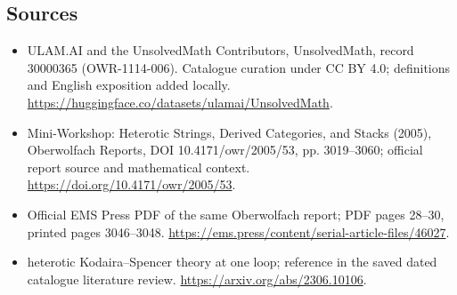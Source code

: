 \documentclass[11pt]{article}
\begin{document}
\subsection{Sources}
\begin{itemize}
\item[\hypertarget{source:30000365:1}{S1}] ULAM.AI and the UnsolvedMath Contributors, UnsolvedMath, record 30000365 (OWR-1114-006). Catalogue curation under CC BY 4.0; definitions and English exposition added locally.
\url{https://huggingface.co/datasets/ulamai/UnsolvedMath}.
\item[\hypertarget{source:30000365:2}{S2}] Mini-Workshop: Heterotic Strings, Derived Categories, and Stacks (2005), Oberwolfach Reports, DOI 10.4171/owr/2005/53, pp. 3019--3060; official report source and mathematical context.
\url{https://doi.org/10.4171/owr/2005/53}.
\item[\hypertarget{source:30000365:3}{S3}] Official EMS Press PDF of the same Oberwolfach report; PDF pages 28--30, printed pages 3046--3048.
\url{https://ems.press/content/serial-article-files/46027}.
\item[\hypertarget{source:30000365:4}{S4}] heterotic Kodaira--Spencer theory at one loop; reference in the saved dated catalogue literature review.
\url{https://arxiv.org/abs/2306.10106}.
\end{itemize}
\label{end:30000365}
\end{document}
